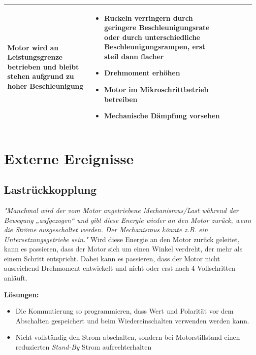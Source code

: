 {{{{{{{\begin{center}
\begin{tabularx}{\textwidth}{|X|X|X|X|X|X|}
						Motor wird an Leistungsgrenze betrieben und bleibt stehen aufgrund zu hoher Beschleunigung & 
						\begin{itemize} 
							\item {Ruckeln verringern durch geringere Beschleunigungsrate oder durch unterschiedliche Beschleunigungsrampen, erst steil dann flacher} 
							\item {Drehmoment erhöhen} 
							\item {Motor im Mikroschrittbetrieb betreiben} 
							\item {Mechanische Dämpfung vorsehen} 
						\end{itemize}	 \\	\hline
					\end{tabularx}
				\end{center}
				
				
				
				\section{Externe Ereignisse}
				\subsection{Lastrückkopplung}
				\textit{"Manchmal wird der vom Motor angetriebene Mechanismus/Last während der Bewegung „aufgezogen“ und gibt diese Energie wieder an den Motor zurück, wenn die Ströme ausgeschaltet werden. Der Mechanismus könnte z.B. ein Untersetzungsgetriebe sein."}\cite{Faulhaber:2020} 
				Wird diese Energie an den Motor zurück geleitet, kann es passieren, dass der Motor sich um einen Winkel verdreht, der mehr als einem Schritt entspricht. Dabei kann es passieren, dass der Motor nicht ausreichend Drehmoment entwickelt und nicht oder erst nach 4 Vollschritten anläuft. \cite{Faulhaber:2020}
				
				\textbf{Lösungen:}
				\begin{itemize}
					\item Die Kommutierung so programmieren, dass Wert und Polarität vor dem Abschalten gespeichert und beim Wiedereinschalten verwenden werden kann. 
					\item Nicht vollständig den Strom abschalten, sondern bei Motorstillstand einen reduzierten \textit{Stand-By} Strom aufrechterhalten
				\end{itemize}
				
}}}}}}}
